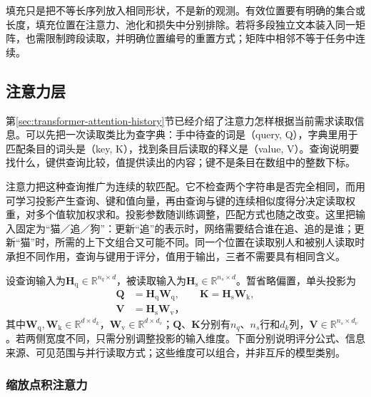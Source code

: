 填充只是把不等长序列放入相同形状，不是新的观测。有效位置要有明确的集合或长度，填充位置在注意力、池化和损失中分别排除。若将多段独立文本装入同一矩阵，也需限制跨段读取，并明确位置编号的重置方式；矩阵中相邻不等于任务中连续。

\subsection{注意力层}
\label{sec:transformer-attention}

第\ref{sec:transformer-attention-history}节已经介绍了注意力怎样根据当前需求读取信息。可以先把一次读取类比为查字典：手中待查的词是（query, Q），字典里用于匹配条目的词头是（key, K），找到条目后读取的释义是（value, V）。查询说明要找什么，键供查询比较，值提供读出的内容；键不是条目在数组中的整数下标。

注意力把这种查询推广为连续的软匹配。它不检查两个字符串是否完全相同，而用可学习投影产生查询、键和值向量，再由查询与键的连续相似度得分决定读取权重，对多个值软加权求和。投影参数随训练调整，匹配方式也随之改变。这里把输入固定为“猫／追／狗”：更新“追”的表示时，网络需要结合谁在追、追的是谁；更新“猫”时，所需的上下文组合又可能不同。同一个位置在读取别人和被别人读取时承担不同作用，查询与键用于评分，值用于输出，三者不需要具有相同含义。

设查询输入为$\bm H_{\mathrm q}\in\mathbb R^{n_q\times d}$，被读取输入为$\bm H_{\mathrm s}\in\mathbb R^{n_s\times d}$。暂省略偏置，单头投影为
\begin{equation}
  \begin{aligned}
    \bm Q&=\bm H_{\mathrm q}\bm W_{\mathrm q},\qquad
    \bm K=\bm H_{\mathrm s}\bm W_{\mathrm k},\\
    \bm V&=\bm H_{\mathrm s}\bm W_{\mathrm v}\text{，}
  \end{aligned}
  \label{eq:transformer-qkv}
\end{equation}
其中$\bm W_{\mathrm q},\bm W_{\mathrm k}\in\mathbb R^{d\times d_k}$，$\bm W_{\mathrm v}\in\mathbb R^{d\times d_v}$；$\bm Q$、$\bm K$分别有$n_q$、$n_s$行和$d_k$列，$\bm V\in\mathbb R^{n_s\times d_v}$。若两侧宽度不同，只需分别调整投影的输入维度。下面分别说明评分公式、信息来源、可见范围与并行读取方式；这些维度可以组合，并非互斥的模型类别。

\subsubsection{缩放点积注意力}

